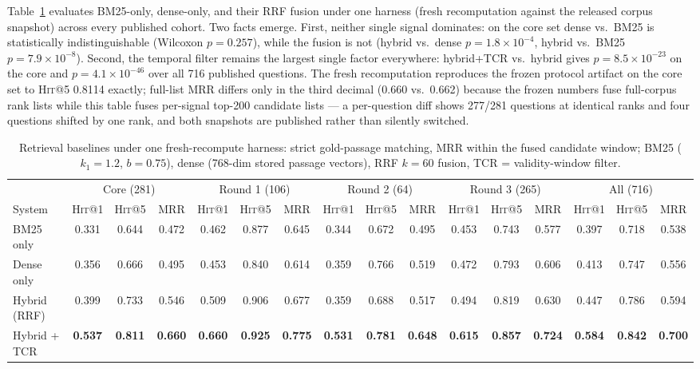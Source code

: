 \documentclass[10pt,a4paper,twocolumn]{article}
\newcommand{\hit}{\textsc{Hit}}
\begin{document}
Table~\ref{tab:baselines} evaluates BM25-only, dense-only, and their RRF fusion under one harness (fresh recomputation against the released corpus snapshot) across every published cohort. Two facts emerge. First, neither single signal dominates: on the core set dense vs.\ BM25 is statistically indistinguishable (Wilcoxon $p=0.257$), while the fusion is not (hybrid vs.\ dense $p=1.8\times10^{-4}$, hybrid vs.\ BM25 $p=7.9\times10^{-8}$). Second, the temporal filter remains the largest single factor everywhere: hybrid+TCR vs.\ hybrid gives $p=8.5\times10^{-23}$ on the core and $p=4.1\times10^{-46}$ over all 716 published questions. The fresh recomputation reproduces the frozen protocol artifact on the core set to \hit{}@5 0.8114 exactly; full-list MRR differs only in the third decimal (0.660 vs.\ 0.662) because the frozen numbers fuse full-corpus rank lists while this table fuses per-signal top-200 candidate lists --- a per-question diff shows 277/281 questions at identical ranks and four questions shifted by one rank, and both snapshots are published rather than silently switched.

\begin{table}[t]
\centering\scriptsize
\caption{Retrieval baselines under one fresh-recompute harness: strict gold-passage matching, MRR within the fused candidate window; BM25 ($k_1{=}1.2$, $b{=}0.75$), dense (768-dim stored passage vectors), RRF $k{=}60$ fusion, TCR = validity-window filter.}
\label{tab:baselines}
\setlength{\tabcolsep}{3.0pt}
\begin{tabular}{l ccc ccc ccc ccc ccc}
\toprule
& \multicolumn{3}{c}{Core (281)} & \multicolumn{3}{c}{Round 1 (106)} & \multicolumn{3}{c}{Round 2 (64)} & \multicolumn{3}{c}{Round 3 (265)} & \multicolumn{3}{c}{All (716)} \\
\cmidrule(lr){2-4}\cmidrule(lr){5-7}\cmidrule(lr){8-10}\cmidrule(lr){11-13}\cmidrule(lr){14-16}
System & \hit{}@1 & \hit{}@5 & MRR & \hit{}@1 & \hit{}@5 & MRR & \hit{}@1 & \hit{}@5 & MRR & \hit{}@1 & \hit{}@5 & MRR & \hit{}@1 & \hit{}@5 & MRR \\
\midrule
BM25 only & 0.331 & 0.644 & 0.472 & 0.462 & 0.877 & 0.645 & 0.344 & 0.672 & 0.495 & 0.453 & 0.743 & 0.577 & 0.397 & 0.718 & 0.538 \\
Dense only & 0.356 & 0.666 & 0.495 & 0.453 & 0.840 & 0.614 & 0.359 & 0.766 & 0.519 & 0.472 & 0.793 & 0.606 & 0.413 & 0.747 & 0.556 \\
Hybrid (RRF) & 0.399 & 0.733 & 0.546 & 0.509 & 0.906 & 0.677 & 0.359 & 0.688 & 0.517 & 0.494 & 0.819 & 0.630 & 0.447 & 0.786 & 0.594 \\
Hybrid + TCR & \textbf{0.537} & \textbf{0.811} & \textbf{0.660} & \textbf{0.660} & \textbf{0.925} & \textbf{0.775} & \textbf{0.531} & \textbf{0.781} & \textbf{0.648} & \textbf{0.615} & \textbf{0.857} & \textbf{0.724} & \textbf{0.584} & \textbf{0.842} & \textbf{0.700} \\
\bottomrule
\end{tabular}
\end{table}
\end{document}
